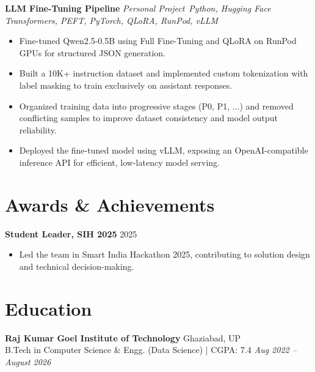 \documentclass[a4paper,10pt]{article}
\begin{document}
\vspace{6pt}

\textbf{LLM Fine-Tuning Pipeline} \hfill
\textit{Personal Project}\
\textit{Python, Hugging Face Transformers, PEFT, PyTorch, QLoRA, RunPod, vLLM}
\begin{itemize}[leftmargin=*]

\item Fine-tuned Qwen2.5-0.5B using Full Fine-Tuning and QLoRA on RunPod GPUs for structured JSON generation.

\item Built a 10K+ instruction dataset and implemented custom tokenization with label masking to train exclusively on assistant responses.

\item Organized training data into progressive stages (P0, P1, ...) and removed conflicting samples to improve dataset consistency and model output reliability.

\item Deployed the fine-tuned model using vLLM, exposing an OpenAI-compatible inference API for efficient, low-latency model serving.

\end{itemize}

\section*{Awards \& Achievements}

\textbf{Student Leader, SIH 2025} \hfill 2025
\begin{itemize}[leftmargin=*]
   \item Led the team in Smart India Hackathon 2025, contributing to solution design and technical decision-making.
\end{itemize}

\section*{Education}

\textbf{Raj Kumar Goel Institute of Technology} \hfill Ghaziabad, UP\\
B.Tech in Computer Science \& Engg. (Data Science) | CGPA: 7.4
\hfill \textit{Aug 2022 -- August 2026}
\end{document}

